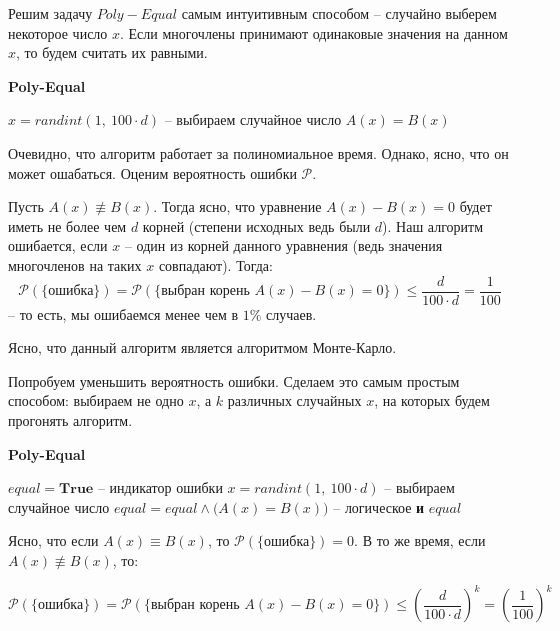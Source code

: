 \documentclass[a4paper,12pt]{article}
\renewcommand{\P}{\mathcal{P}}
\begin{document}
Решим задачу $Poly-Equal$ самым интуитивным способом -- случайно выберем некоторое число $x$. Если многочлены принимают одинаковые значения на данном $x$, то будем считать их равными. 

\begin{algorithm}[H]
    \caption{\textbf{Poly-Equal}}
    \begin{algorithmic}[1]
        \Statex
        \State $x = randint(1,\ 100\cdot d)$ -- выбираем случайное число
        \State \Return $A(x) = B(x)$
    \end{algorithmic}
\end{algorithm}

Очевидно, что алгоритм работает за полиномиальное время. Однако, ясно, что он может ошабаться. Оценим вероятность ошибки $\P$.

Пусть $A(x) \not\equiv B(x)$. Тогда ясно, что уравнение $A(x) - B(x) = 0$ будет иметь не более чем $d$ корней (степени исходных ведь были $d$). Наш алгоритм  ошибается, если $x$ -- один из корней данного уравнения (ведь значения многочленов на таких $x$ совпадают). Тогда:
\[\P(\{\text{ошибка}\}) = \P(\{\text{выбран корень }A(x) - B(x) = 0\}) \leqslant \dfrac{d}{100\cdot d} = \dfrac{1}{100} \] -- то есть, мы ошибаемся менее чем в $1\%$ случаев.

Ясно, что данный алгоритм является алгоритмом Монте-Карло.

Попробуем уменьшить вероятность ошибки. Сделаем это самым простым способом: выбираем не одно $x$, а $k$ различных случайных $x$, на которых будем прогонять алгоритм.

\begin{algorithm}[H]
    \caption{\textbf{Poly-Equal}}
    \begin{algorithmic}[1]
        \Statex
        \State $equal = \textbf{True}$ -- индикатор ошибки
            \State $x = randint(1,\ 100\cdot d)$ -- выбираем случайное число
            \State $equal = equal \wedge \big(A(x) = B(x)\big)$ -- логическое \textbf{и}
        \EndFor
        \State \Return $equal$
    \end{algorithmic}
\end{algorithm}

Ясно, что если $A(x) \equiv B(x)$, то $\P(\{\text{ошибка}\}) = 0$. В то же время, если $A(x) \not\equiv B(x)$, то:

\[\P(\{\text{ошибка}\}) = \P(\{\text{выбран корень }A(x) - B(x) = 0\}) \leqslant \left(\dfrac{d}{100\cdot d}\right)^k = \left(\dfrac{1}{100}\right)^k \]
\end{document}
